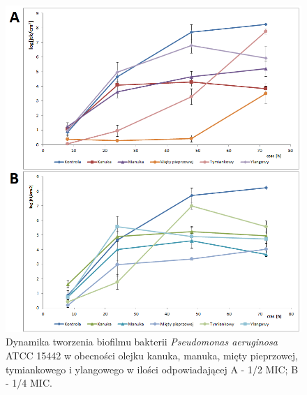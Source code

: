 \documentclass[11pt,a4paper]{report}
\begin{document}
\begin{figure}[!h]
\begin{center}
\includegraphics[scale=0.7]{img/ref-b.png}
\caption{Dynamika tworzenia biofilmu bakterii \textit{Pseudomonas aeruginosa} ATCC 15442 w obecności olejku kanuka, manuka, mięty pieprzowej, tymiankowego i ylangowego w ilości odpowiadającej A - 1/2 MIC; B - 1/4 MIC.}\label{ref-b}
\end{center} 
\end{figure}
\clearpage
\end{document}

